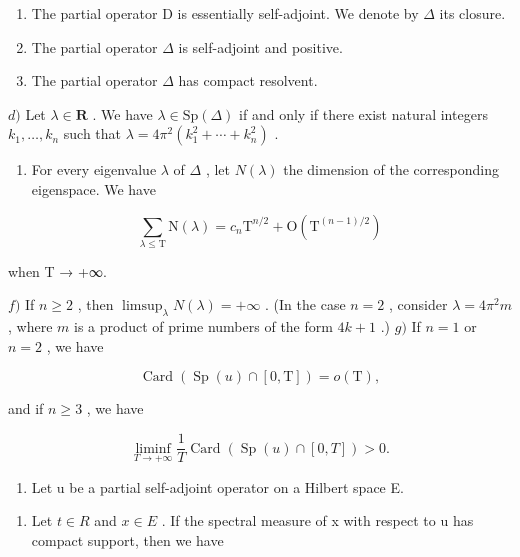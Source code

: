\begin{enumerate}
\def\labelenumi{\alph{enumi})}
\item
  The partial operator D is essentially self-adjoint. We denote by \(\Delta\) its closure.
\item
  The partial operator \(\Delta\) is self-adjoint and positive.
\item
  The partial operator \(\Delta\) has compact resolvent.
\end{enumerate}

\(d)\) Let \(\lambda\in\mathbf{R}\) . We have \(\lambda\in\mathrm{Sp}(\Delta)\) if and only if there exist natural integers \(k_{1},\ldots,k_{n}\) such that \(\lambda=4\pi^{2}(k_{1}^{2}+\cdots+k_{n}^{2})\) .

\begin{enumerate}
\def\labelenumi{\alph{enumi})}
\setcounter{enumi}{4}
\tightlist
\item
  For every eigenvalue \(\lambda\) of \(\Delta\) , let \(N(\lambda)\) the dimension of the corresponding eigenspace. We have
\end{enumerate}

\[
\sum_ {\lambda \leqslant \mathrm{T}} \mathrm{N} (\lambda) = c _ {n} \mathrm{T} ^ {n / 2} + \mathrm{O} (\mathrm{T} ^ {(n - 1) / 2})
\]

when T → +∞.

\(f)\) If \(n \geqslant 2\) , then \(\limsup_{\lambda} N(\lambda) = +\infty\) . (In the case \(n = 2\) , consider \(\lambda = 4\pi^2 m\) , where \(m\) is a product of prime numbers of the form \(4k + 1\) .) \(g)\) If \(n = 1\) or \(n = 2\) , we have

\[
\operatorname{Card} (\operatorname{Sp} (u) \cap [ 0, \mathrm{T} ]) = o (\mathrm{T}),
\]

and if \(n\geqslant 3\) , we have

\[
\liminf _ {T \to + \infty} \frac {1}{T} \operatorname{Card} (\operatorname{Sp} (u) \cap [ 0, T ]) > 0.
\]

\begin{enumerate}
\def\labelenumi{\arabic{enumi})}
\setcounter{enumi}{18}
\tightlist
\item
  Let u be a partial self-adjoint operator on a Hilbert space E.
\end{enumerate}

\begin{enumerate}
\def\labelenumi{\alph{enumi})}
\tightlist
\item
  Let \(t \in R\) and \(x \in E\) . If the spectral measure of x with respect to u has compact support, then we have
\end{enumerate}

